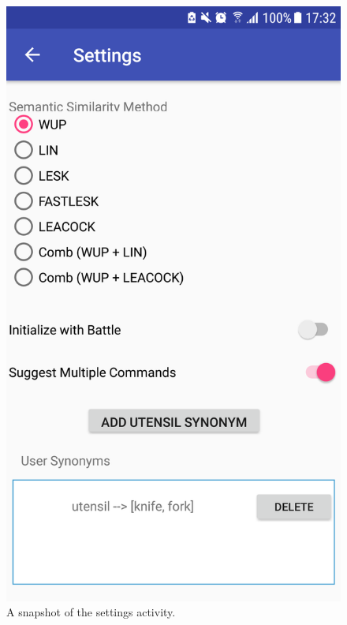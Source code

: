 \documentclass[11pt]{article}
\begin{document}
\begin{center}
\begin{figure}[H]
\begin{center}
  \includegraphics[scale=0.25]{settings.png}
  \caption{A snapshot of the settings activity.}
  \label{fig:snapshot-settings}
  \end{center}
\end{figure}
\end{center}

\newpage
\end{document}
